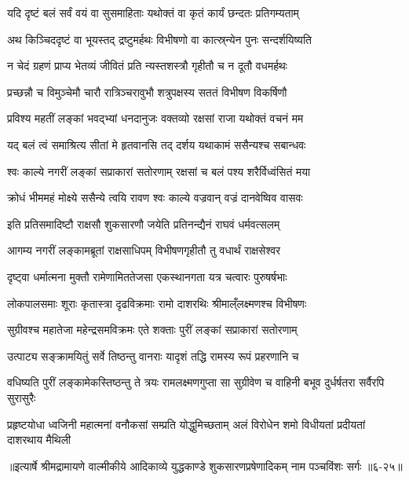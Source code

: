 \twolineshloka
{यदि दृष्टं बलं सर्वं वयं वा सुसमाहिताः}
{यथोक्तं वा कृतं कार्यं छन्दतः प्रतिगम्यताम्} %

\twolineshloka
{अथ किञ्चिददृष्टं वा भूयस्तद् द्रष्टुमर्हथः}
{विभीषणो वा कात्स्र्न्येन पुनः सन्दर्शयिष्यति} %

\twolineshloka
{न चेदं ग्रहणं प्राप्य भेतव्यं जीवितं प्रति}
{न्यस्तशस्त्रौ गृहीतौ च न दूतौ वधमर्हथः} %

\twolineshloka
{प्रच्छन्नौ च विमुञ्चेमौ चारौ रात्रिञ्चरावुभौ}
{शत्रुपक्षस्य सततं विभीषण विकर्षिणौ} %

\twolineshloka
{प्रविश्य महतीं लङ्कां भवद्भ्यां धनदानुजः}
{वक्तव्यो रक्षसां राजा यथोक्तं वचनं मम} %

\twolineshloka
{यद् बलं त्वं समाश्रित्य सीतां मे हृतवानसि}
{तद् दर्शय यथाकामं ससैन्यश्च सबान्धवः} %

\twolineshloka
{श्वः काल्ये नगरीं लङ्कां सप्राकारां सतोरणाम्}
{रक्षसां च बलं पश्य शरैर्विध्वंसितं मया} %

\twolineshloka
{क्रोधं भीममहं मोक्ष्ये ससैन्ये त्वयि रावण}
{श्वः काल्ये वज्रवान् वज्रं दानवेष्विव वासवः} %

\twolineshloka
{इति प्रतिसमादिष्टौ राक्षसौ शुकसारणौ}
{जयेति प्रतिनन्द्यैनं राघवं धर्मवत्सलम्} %

\twolineshloka
{आगम्य नगरीं लङ्कामब्रूतां राक्षसाधिपम्}
{विभीषणगृहीतौ तु वधार्थं राक्षसेश्वर} %

\twolineshloka
{दृष्ट्वा धर्मात्मना मुक्तौ रामेणामिततेजसा}
{एकस्थानगता यत्र चत्वारः पुरुषर्षभाः} %

\twolineshloka
{लोकपालसमाः शूराः कृतास्त्रा दृढविक्रमाः}
{रामो दाशरथिः श्रीमाल्ँलक्ष्मणश्च विभीषणः} %

\twolineshloka
{सुग्रीवश्च महातेजा महेन्द्रसमविक्रमः}
{एते शक्ताः पुरीं लङ्कां सप्राकारां सतोरणाम्} %

\twolineshloka
{उत्पाट्य सङ्क्रामयितुं सर्वे तिष्ठन्तु वानराः}
{यादृशं तद्धि रामस्य रूपं प्रहरणानि च} %

\threelineshloka
{वधिष्यति पुरीं लङ्कामेकस्तिष्ठन्तु ते त्रयः}
{रामलक्ष्मणगुप्ता सा सुग्रीवेण च वाहिनी}
{बभूव दुर्धर्षतरा सर्वैरपि सुरासुरैः} %

\twolineshloka
{प्रहृष्टयोधा ध्वजिनी महात्मनां वनौकसां सम्प्रति योद्धुमिच्छताम्}
{अलं विरोधेन शमो विधीयतां प्रदीयतां दाशरथाय मैथिली} %


॥इत्यार्षे श्रीमद्रामायणे वाल्मीकीये आदिकाव्ये युद्धकाण्डे शुकसारणप्रषेणादिकम् नाम पञ्चविंशः सर्गः ॥६-२५॥
